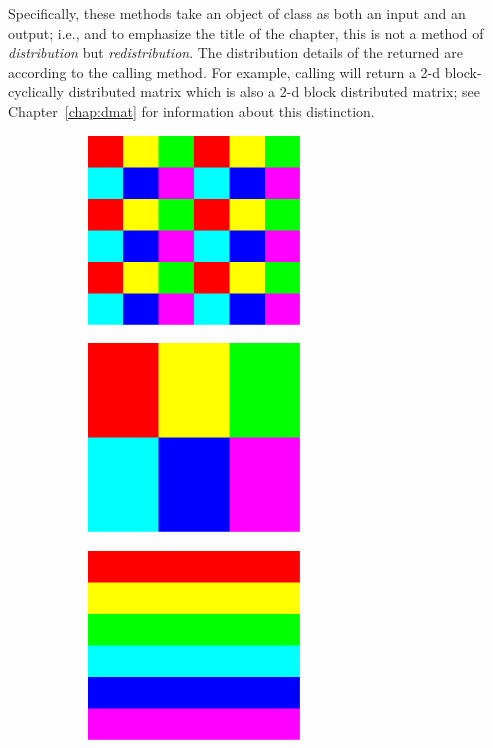 Specifically, these methods take an object of class 
 as both an input and an output; 
i.e., and to emphasize the title of the chapter, this is not a method of 
\emph{distribution} but \emph{redistribution}.  The distribution details of 
the returned  are according to the calling method.  For example, 
calling  will return a 2-d block-cyclically distributed matrix 
which is also a 2-d block distributed matrix; see Chapter~\ref{chap:dmat} for 
information about this distinction.

\begin{figure}[ht]
        \centering
        \begin{subfigure}[b]{0.3\textwidth}
                \centering
\includegraphics[height=5cm,width=\textwidth]{pbdDEMO-include/pics/bc}
                \caption{}
        \end{subfigure}
        \hspace{.1cm}
        \begin{subfigure}[b]{0.3\textwidth}
                \centering
\includegraphics[height=5cm,width=\textwidth]{pbdDEMO-include/pics/block}
                \caption{}
        \end{subfigure}
        \hspace{.1cm}
        \begin{subfigure}[b]{0.3\textwidth}
                \centering
\includegraphics[height=5cm,width=\textwidth]{pbdDEMO-include/pics/rowblock}

\end{subfigure}
\end{figure}
